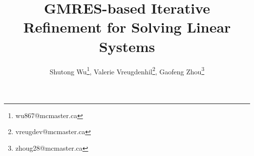 \documentclass[12pt]{article}
\begin{document}
%
\title{GMRES-based Iterative Refinement for
Solving Linear Systems}


\author{Shutong Wu\thanks{wu867@mcmaster.ca}, Valerie Vreugdenhil\thanks{vreugdev@mcmaster.ca}, Gaofeng Zhou\thanks{zhoug28@mcmaster.ca}}
%
%
\maketitle             
\newpage
\tableofcontents
\newpage








%
\end{document}
